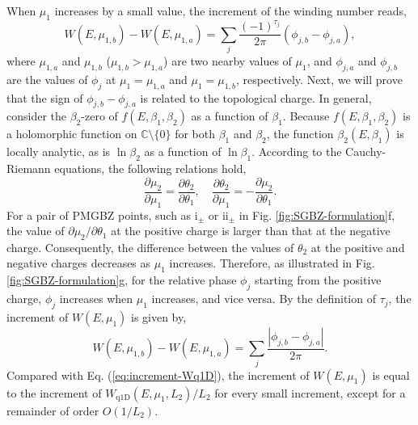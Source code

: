 \documentclass[pdflatex,sn-nature, iicol]{sn-jnl}%
\theoremstyle{thmstyleone}%
\theoremstyle{thmstyletwo}%
\theoremstyle{thmstylethree}%
\begin{document}
When $\mu_{1}$ increases by a small value, the increment of the winding
number reads, 
\begin{equation}
W\left(E,\mu_{1,b}\right)-W\left(E,\mu_{1,a}\right)=\sum_{j}\frac{\left(-1\right)^{\tau_{j}}}{2\pi}\left(\phi_{j,b}-\phi_{j,a}\right),
\end{equation}
where $\mu_{1,a}$ and $\mu_{1,b}$ ($\mu_{1,b}>\mu_{1,a}$) are two
nearby values of $\mu_{1}$, and $\phi_{j,a}$ and $\phi_{j,b}$ are
the values of $\phi_{j}$ at $\mu_{1}=\mu_{1,a}$ and $\mu_{1}=\mu_{1,b}$,
respectively. Next, we will prove that the sign of $\phi_{j,b}-\phi_{j,a}$
is related to the topological charge. In general, consider the $\beta_{2}$-zero
of $f(E,\beta_{1},\beta_{2})$ as a function of $\beta_{1}$. Because
$f(E,\beta_{1},\beta_{2})$ is a holomorphic function on $\mathbb{C}\setminus\{0\}$
for both $\beta_{1}$ and $\beta_{2}$, the function $\beta_{2}(E,\beta_{1})$
is locally analytic, as is $\ln\beta_{2}$ as a function of $\ln\beta_{1}$.
According to the Cauchy-Riemann equations, the following relations
hold, 
\begin{equation}
\frac{\partial\mu_{2}}{\partial\mu_{1}}=\frac{\partial\theta_{2}}{\partial\theta_{1}},\quad\frac{\partial\theta_{2}}{\partial\mu_{1}}=-\frac{\partial\mu_{2}}{\partial\theta_{1}}.\label{eq:Cauchy-Riemann}
\end{equation}
For a pair of PMGBZ points, such as $\text{i}_{\pm}$ or $\text{ii}_{\pm}$
in Fig. \ref{fig:SGBZ-formulation}f, the value of $\partial\mu_{2}/\partial\theta_{1}$
at the positive charge is larger than that at the negative charge.
Consequently, the difference between the values of $\theta_{2}$ at
the positive and negative charges decreases as $\mu_{1}$ increases.
Therefore, as illustrated in Fig. \ref{fig:SGBZ-formulation}g, for
the relative phase $\phi_{j}$ starting from the positive charge,
$\phi_{j}$ increases when $\mu_{1}$ increases, and vice versa. By
the definition of $\tau_{j}$, the increment of $W(E,\mu_{1})$ is
given by, 
\begin{equation}
W\left(E,\mu_{1,b}\right)-W\left(E,\mu_{1,a}\right)=\sum_{j}\frac{\left|\phi_{j,b}-\phi_{j,a}\right|}{2\pi}.
\end{equation}
Compared with Eq. (\ref{eq:increment-Wq1D}), the increment of $W(E,\mu_{1})$
is equal to the increment of $W_{\text{q1D}}(E,\mu_{1},L_{2})/L_{2}$
for every small increment, except for a remainder of order $O(1/L_{2})$.
\end{document}

